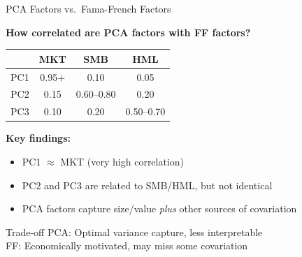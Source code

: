 \documentclass[10pt]{beamer}
\begin{document}
\begin{frame}{PCA Factors vs.\ Fama-French Factors}

  \textbf{How correlated are PCA factors with FF factors?}

  \vspace{0.5em}
  \begin{center}
  \begin{tabular}{lccc}
    \toprule
    & \textbf{MKT} & \textbf{SMB} & \textbf{HML} \\
    \midrule
    PC1 & 0.95+ & 0.10 & 0.05 \\
    PC2 & 0.15 & 0.60--0.80 & 0.20 \\
    PC3 & 0.10 & 0.20 & 0.50--0.70 \\
    \bottomrule
  \end{tabular}
  \end{center}

  \vspace{1em}
  \textbf{Key findings:}
  \begin{itemize}
    \item PC1 $\approx$ MKT (very high correlation)
    \item PC2 and PC3 are related to SMB/HML, but not identical
    \item PCA factors capture size/value \emph{plus} other sources of covariation
  \end{itemize}

  \vspace{0.5em}
  \begin{block}{Trade-off}
    PCA: Optimal variance capture, less interpretable\\
    FF: Economically motivated, may miss some covariation
  \end{block}
\end{frame}

\end{document}

